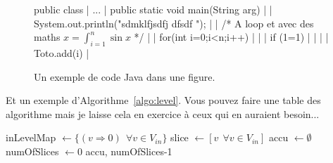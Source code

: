 

\begin{figure}[!t]
\begin{code}
\begin{java}
public class {
|	...
|	public static void main(String arg){
|	|	System.out.println("sdmklfjsdfj dfsdf ");
|	|	/* A loop et avec des maths $x=\int_{i=1}^n \sin{x}$ */
|	|	for(int i=0;i<n;i++)
|	|	|	if (1=1)
|	|	|	|	Toto.add(i)
|	}
}
\end{java}
\end{code}
\caption{Un exemple de code Java dans une figure.}
\label{fig:code1}
\end{figure}

Et un exemple d'Algorithme~\ref{algo:level}. Vous pouvez faire une table des algorithme mais je laisse cela en exercice à ceux qui en auraient besoin...

\begin{algorithm}[!t]
\SetAlgoLined
{}
\BlankLine
inLevelMap $\leftarrow \{ (v\!\Rightarrow\!0) \ \ \forall v\!\in V_{in} \}$ \;
slice $\leftarrow [ v                 \ \ \forall v\!\in V_{in} ]$ \;
accu $\leftarrow \emptyset$ \;
numOfSlices $\leftarrow 0$ \;
\Return accu, numOfSlices-1

\caption{Building the level of each gate.}
\label{algo:level}
\end{algorithm}

